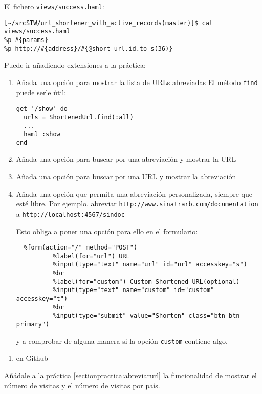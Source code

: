 El fichero \verb|views/success.haml|:
\begin{verbatim}
[~/srcSTW/url_shortener_with_active_records(master)]$ cat views/success.haml 
%p #{params}
%p http://#{address}/#{@short_url.id.to_s(36)}

\end{verbatim}

Puede ir añadiendo extensiones a la práctica:
\begin{enumerate}
\item Añada una opción para mostrar la lista de URLs abreviadas
El método \verb|find| puede serle útil:
\begin{verbatim}
get '/show' do
  urls = ShortenedUrl.find(:all)
  ...
  haml :show
end
\end{verbatim}
\item Añada una opción para buscar por una abreviación y mostrar la URL
\item Añada una opción para buscar por una URL y mostrar la abreviación
\item Añada una opción que permita una abreviación personalizada, siempre que esté libre. 
Por ejemplo, abreviar
\verb|http://www.sinatrarb.com/documentation| a \verb|http://localhost:4567/sindoc|

Esto obliga a 
poner una opción para ello en el formulario:
\begin{verbatim}
  %form(action="/" method="POST")
          %label(for="url") URL
          %input(type="text" name="url" id="url" accesskey="s")
          %br
          %label(for="custom") Custom Shortened URL(optional)
          %input(type="text" name="custom" id="custom" accesskey="t")
          %br
          %input(type="submit" value="Shorten" class="btn btn-primary")
\end{verbatim}
y a comprobar de alguna manera si la opción \verb|custom| contiene algo.
\end{enumerate}

\begin{enumerate}
\item 
{}
en Github
\end{enumerate}


Añádale a la práctica 
\ref{sectionpractica:abreviarurl}
la funcionalidad de mostrar el número de visitas y el número de visitas por país.

